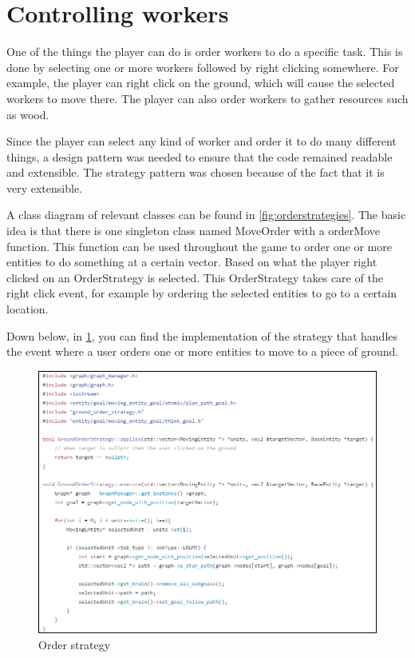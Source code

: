 \section{Controlling workers}

One of the things the player can do is order workers to do a specific task. This is done by selecting one or more workers followed by right clicking somewhere. For example, the player can right click on the ground, which will cause the selected workers to move there. The player can also order workers to gather resources such as wood.

Since the player can select any kind of worker and order it to do many different things, a design pattern was needed to ensure that the code remained readable and extensible. The strategy pattern was chosen because of the fact that it is very extensible. 

A class diagram of relevant classes can be found in \cref{fig:orderstrategies}. The basic idea is that there is one singleton class named MoveOrder with a orderMove function. This function can be used throughout the game to order one or more entities to do something at a certain vector. Based on what the player right clicked on an OrderStrategy is selected. This OrderStrategy takes care of the right click event, for example by ordering the selected entities to go to a certain location.

Down below, in \cref{fig:orderstrategy}, you can find the implementation of the strategy that handles the event where a user orders one or more entities to move to a piece of ground.

\begin{figure}[!htb]
    \centering
    \includegraphics[angle=0,origin=c,scale=0.66]
    {images/order-strategy.png}
    \caption{Order strategy}\label{fig:orderstrategy}
\end{figure}

